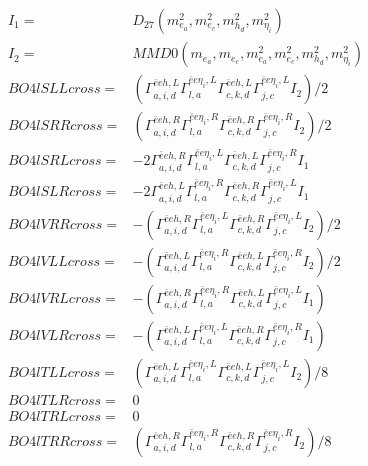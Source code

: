 \documentclass[A4,landscape]{article}
\begin{document}
\begin{align} 
I_1 = & D_{27}(m^2_{e_{{a}}}, m^2_{e_{{c}}}, m^2_{h_{{d}}}, m^2_{\eta_i}) \\ 
I_2 = & MMD0(m_{e_{{a}}}, m_{e_{{c}}}, m^2_{e_{{a}}}, m^2_{e_{{c}}}, m^2_{h_{{d}}}, m^2_{\eta_i}) \\ 
  BO4lSLLcross= & ( \Gamma^{\bar{e}e h ,L}_{a, i, d} \Gamma^{\bar{e}e \eta_i ,L}_{l, a} \Gamma^{\bar{e}e h ,L}_{c, k, d} \Gamma^{\bar{e}e \eta_i ,L}_{j, c} I_2)/2 \\ 
  BO4lSRRcross= & ( \Gamma^{\bar{e}e h ,R}_{a, i, d} \Gamma^{\bar{e}e \eta_i ,R}_{l, a} \Gamma^{\bar{e}e h ,R}_{c, k, d} \Gamma^{\bar{e}e \eta_i ,R}_{j, c} I_2)/2 \\ 
  BO4lSRLcross= & -2  \Gamma^{\bar{e}e h ,R}_{a, i, d} \Gamma^{\bar{e}e \eta_i ,L}_{l, a} \Gamma^{\bar{e}e h ,L}_{c, k, d} \Gamma^{\bar{e}e \eta_i ,R}_{j, c} I_1 \\ 
  BO4lSLRcross= & -2  \Gamma^{\bar{e}e h ,L}_{a, i, d} \Gamma^{\bar{e}e \eta_i ,R}_{l, a} \Gamma^{\bar{e}e h ,R}_{c, k, d} \Gamma^{\bar{e}e \eta_i ,L}_{j, c} I_1 \\ 
  BO4lVRRcross= & -( \Gamma^{\bar{e}e h ,R}_{a, i, d} \Gamma^{\bar{e}e \eta_i ,L}_{l, a} \Gamma^{\bar{e}e h ,R}_{c, k, d} \Gamma^{\bar{e}e \eta_i ,L}_{j, c} I_2)/2 \\ 
  BO4lVLLcross= & -( \Gamma^{\bar{e}e h ,L}_{a, i, d} \Gamma^{\bar{e}e \eta_i ,R}_{l, a} \Gamma^{\bar{e}e h ,L}_{c, k, d} \Gamma^{\bar{e}e \eta_i ,R}_{j, c} I_2)/2 \\ 
  BO4lVRLcross= & -( \Gamma^{\bar{e}e h ,R}_{a, i, d} \Gamma^{\bar{e}e \eta_i ,R}_{l, a} \Gamma^{\bar{e}e h ,L}_{c, k, d} \Gamma^{\bar{e}e \eta_i ,L}_{j, c} I_1) \\ 
  BO4lVLRcross= & -( \Gamma^{\bar{e}e h ,L}_{a, i, d} \Gamma^{\bar{e}e \eta_i ,L}_{l, a} \Gamma^{\bar{e}e h ,R}_{c, k, d} \Gamma^{\bar{e}e \eta_i ,R}_{j, c} I_1) \\ 
  BO4lTLLcross= & ( \Gamma^{\bar{e}e h ,L}_{a, i, d} \Gamma^{\bar{e}e \eta_i ,L}_{l, a} \Gamma^{\bar{e}e h ,L}_{c, k, d} \Gamma^{\bar{e}e \eta_i ,L}_{j, c} I_2)/8 \\ 
  BO4lTLRcross= & 0 \\ 
  BO4lTRLcross= & 0 \\ 
  BO4lTRRcross= & ( \Gamma^{\bar{e}e h ,R}_{a, i, d} \Gamma^{\bar{e}e \eta_i ,R}_{l, a} \Gamma^{\bar{e}e h ,R}_{c, k, d} \Gamma^{\bar{e}e \eta_i ,R}_{j, c} I_2)/8 \\ 
\end{align} 
\end{document}

